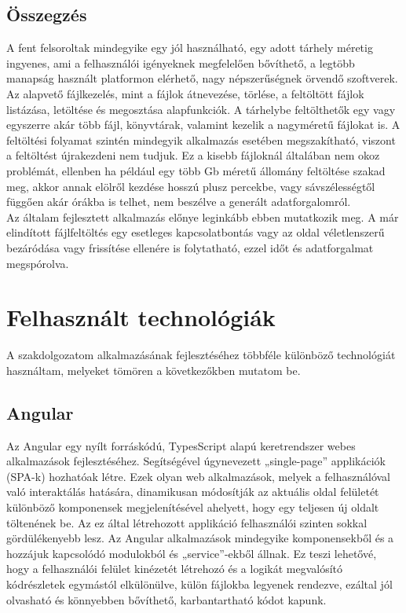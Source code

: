 \documentclass[12pt]{report}
\begin{document}
\section{Összegzés}
A fent felsoroltak mindegyike egy jól használható, egy adott tárhely méretig ingyenes, ami a felhasználói igényeknek megfelelően bővíthető, a legtöbb manapság használt platformon elérhető, nagy népszerűségnek örvendő szoftverek. Az alapvető fájlkezelés, mint a fájlok átnevezése, törlése, a feltöltött fájlok listázása, letöltése és megosztása alapfunkciók. A tárhelybe feltölthetők egy vagy egyszerre akár több fájl, könyvtárak, valamint kezelik a nagyméretű fájlokat is. A feltöltési folyamat szintén mindegyik alkalmazás esetében megszakítható, viszont a feltöltést újrakezdeni nem tudjuk. Ez a kisebb fájloknál általában nem okoz problémát, ellenben ha például egy több Gb méretű állomány feltöltése szakad meg, akkor annak elölről kezdése hosszú plusz percekbe, vagy sávszélességtől függően akár órákba is telhet, nem beszélve a generált adatforgalomról.\\
Az általam fejlesztett alkalmazás előnye leginkább ebben mutatkozik meg. A már elindított fájlfeltöltés egy esetleges kapcsolatbontás vagy az oldal véletlenszerű bezáródása vagy frissítése ellenére is folytatható, ezzel időt és adatforgalmat megspórolva.

\chapter{Felhasznált technológiák}
A szakdolgozatom alkalmazásának fejlesztéséhez többféle különböző technológiát használtam, melyeket tömören a következőkben mutatom be.

\section{Angular}
Az Angular egy nyílt forráskódú, TypesScript alapú keretrendszer webes alkalmazások fejlesztéséhez. Segítségével úgynevezett „single-page” applikációk (SPA-k) hozhatóak létre. Ezek olyan web alkalmazások, melyek a felhasználóval való interaktálás hatására, dinamikusan módosítják az aktuális oldal felületét különböző komponensek megjelenítésével ahelyett, hogy egy teljesen új oldalt töltenének be. Az ez által létrehozott applikáció felhasználói szinten sokkal gördülékenyebb lesz. Az Angular alkalmazások mindegyike komponensekből és a hozzájuk kapcsolódó modulokból és „service”-ekből állnak. Ez teszi lehetővé, hogy a felhasználói felület kinézetét létrehozó és a logikát megvalósító kódrészletek egymástól elkülönülve, külön fájlokba legyenek rendezve, ezáltal jól olvasható és könnyebben bővíthető, karbantartható kódot kapunk.
\end{document}

